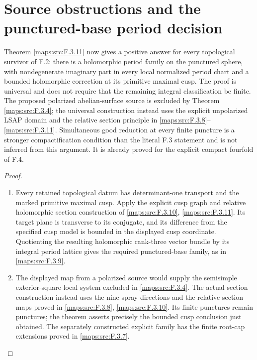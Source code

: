 \section{Source obstructions and the punctured-base period decision}



\begin{proposition}\label{maps:src:F.3.3}


Theorem \ref{maps:src:F.3.11} now gives a positive answer for every topological
survivor of F.2: there is a holomorphic period family on the
punctured sphere, with nondegenerate imaginary part in every
local normalized period chart and a bounded holomorphic
correction at its primitive maximal cusp.  The proof is universal
and does not require that the remaining integral classification
be finite.  The proposed polarized abelian-surface source is
excluded by Theorem \ref{maps:src:F.3.4}; the universal construction instead
uses the explicit unpolarized LSAP domain and the relative
section principle in \ref{maps:src:F.3.8}--\ref{maps:src:F.3.11}.  Simultaneous good reduction
at every finite puncture is a stronger compactification condition
than the literal F.3 statement and is not inferred from this
argument.  It is already proved for the explicit compact
fourfold of F.4.

\end{proposition}
\begin{proof}
\begin{enumerate}[label=\arabic*.]
\item Every retained topological datum has determinant-one transport
and the marked primitive maximal cusp. Apply the explicit cusp graph
and relative holomorphic section construction of
\cref{maps:src:F.3.10}, \cref{maps:src:F.3.11}. Its target plane is transverse
to its conjugate, and its difference from the specified cusp model is
bounded in the displayed cusp coordinate. Quotienting the resulting
holomorphic rank-three vector bundle by its integral period lattice
gives the required punctured-base family, as in \cref{maps:src:F.3.9}.
\item The displayed map from a polarized source would supply the
semisimple exterior-square local system excluded in
\cref{maps:src:F.3.4}. The actual section construction instead uses
the nine spray directions and the relative section maps proved in
\cref{maps:src:F.3.8}, \cref{maps:src:F.3.10}. Its finite punctures remain
punctures; the theorem asserts precisely the bounded cusp conclusion
just obtained. The separately constructed explicit family has the
finite root-cap extensions proved in \cref{maps:src:F.3.7}.
\end{enumerate}
\end{proof}





